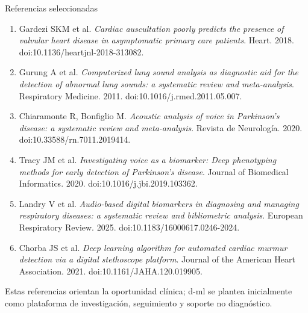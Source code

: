 \documentclass[10pt,aspectratio=169]{beamer}
\begin{document}
\begin{frame}{Referencias seleccionadas}
  \tiny
  \begin{enumerate}
    \item Gardezi SKM et al. \textit{Cardiac auscultation poorly predicts the presence of valvular heart disease in asymptomatic primary care patients}. Heart. 2018. doi:10.1136/heartjnl-2018-313082.
    \item Gurung A et al. \textit{Computerized lung sound analysis as diagnostic aid for the detection of abnormal lung sounds: a systematic review and meta-analysis}. Respiratory Medicine. 2011. doi:10.1016/j.rmed.2011.05.007.
    \item Chiaramonte R, Bonfiglio M. \textit{Acoustic analysis of voice in Parkinson's disease: a systematic review and meta-analysis}. Revista de Neurología. 2020. doi:10.33588/rn.7011.2019414.
    \item Tracy JM et al. \textit{Investigating voice as a biomarker: Deep phenotyping methods for early detection of Parkinson's disease}. Journal of Biomedical Informatics. 2020. doi:10.1016/j.jbi.2019.103362.
    \item Landry V et al. \textit{Audio-based digital biomarkers in diagnosing and managing respiratory diseases: a systematic review and bibliometric analysis}. European Respiratory Review. 2025. doi:10.1183/16000617.0246-2024.
    \item Chorba JS et al. \textit{Deep learning algorithm for automated cardiac murmur detection via a digital stethoscope platform}. Journal of the American Heart Association. 2021. doi:10.1161/JAHA.120.019905.
  \end{enumerate}
  \vspace{0.25cm}
  {\scriptsize Estas referencias orientan la oportunidad clínica; d-ml se plantea inicialmente como plataforma de investigación, seguimiento y soporte no diagnóstico.}
\end{frame}
\end{document}

